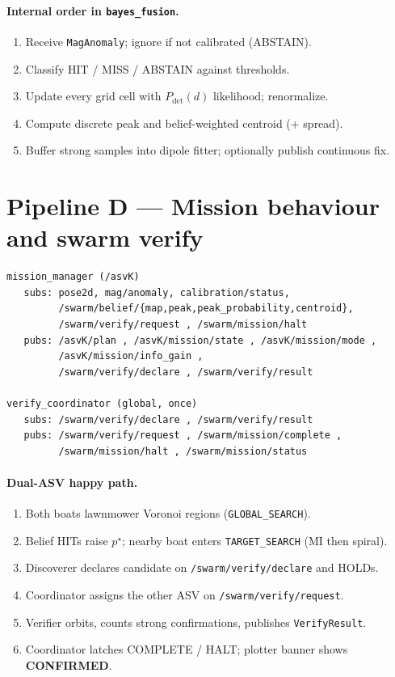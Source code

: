 \paragraph{Internal order in \texttt{bayes\_fusion}.}
\begin{enumerate}[leftmargin=*]
  \item Receive \texttt{MagAnomaly}; ignore if not calibrated (ABSTAIN).
  \item Classify HIT / MISS / ABSTAIN against thresholds.
  \item Update every grid cell with \(P_{\mathrm{det}}(d)\) likelihood; renormalize.
  \item Compute discrete peak and belief-weighted centroid (+ spread).
  \item Buffer strong samples into dipole fitter; optionally publish continuous fix.
\end{enumerate}

\section{Pipeline D --- Mission behaviour and swarm verify}
\begin{verbatim}
mission_manager (/asvK)
   subs: pose2d, mag/anomaly, calibration/status,
         /swarm/belief/{map,peak,peak_probability,centroid},
         /swarm/verify/request , /swarm/mission/halt
   pubs: /asvK/plan , /asvK/mission/state , /asvK/mission/mode ,
         /asvK/mission/info_gain ,
         /swarm/verify/declare , /swarm/verify/result

verify_coordinator (global, once)
   subs: /swarm/verify/declare , /swarm/verify/result
   pubs: /swarm/verify/request , /swarm/mission/complete ,
         /swarm/mission/halt , /swarm/mission/status
\end{verbatim}

\paragraph{Dual-ASV happy path.}
\begin{enumerate}[leftmargin=*]
  \item Both boats lawnmower Voronoi regions (\texttt{GLOBAL\_SEARCH}).
  \item Belief HITs raise \(p^\star\); nearby boat enters
        \texttt{TARGET\_SEARCH} (MI then spiral).
  \item Discoverer declares candidate on \texttt{/swarm/verify/declare} and
        HOLDs.
  \item Coordinator assigns the other ASV on \texttt{/swarm/verify/request}.
  \item Verifier orbits, counts strong confirmations, publishes
        \texttt{VerifyResult}.
  \item Coordinator latches COMPLETE / HALT; plotter banner shows
        \textbf{CONFIRMED}.
\end{enumerate}


